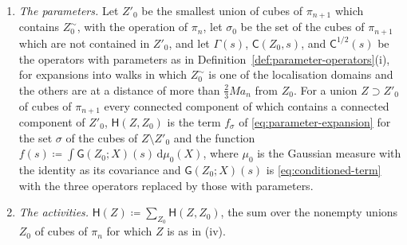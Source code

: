 \documentclass[11pt]{preprint}
\newcommand{\dd}{\mathrm{d}}
\numberwithin{equation}{section}
\begin{document}
\begin{definition}
\begin{enumerate}[label=(\roman*)]
\item \emph{The parameters.} Let $Z'_0$ be the smallest union of cubes of $\pi_{n+1}$ which contains $Z_0^\sim$, with the operation of $\pi_n$, let $\sigma_0$ be the set of the cubes of $\pi_{n+1}$ which are not contained in $Z'_0$, and let $\Gamma(s)$, $\mathsf C(Z_0, s)$, and $\mathsf C^{1/2}(s)$ be the operators with parameters as in Definition~\ref{def:parameter-operators}(i), for expansions into walks in which $Z_0^\sim$ is one of the localisation domains and the others are at a distance of more than $\frac{2}{3}Ma_n$ from $Z_0$. For a union $Z \supset Z'_0$ of cubes of $\pi_{n+1}$ every connected component of which contains a connected component of $Z'_0$, $\mathsf H(Z, Z_0)$ is the term $f_\sigma$ of \eqref{eq:parameter-expansion} for the set $\sigma$ of the cubes of $Z \setminus Z'_0$ and the function $f(s) \coloneqq \int\mathsf G(Z_0; X)(s)\,\dd\mu_0(X)$, where $\mu_0$ is the Gaussian measure with the identity as its covariance and $\mathsf G(Z_0; X)(s)$ is \eqref{eq:conditioned-term} with the three operators replaced by those with parameters.
\item \emph{The activities.} $\mathsf H(Z) \coloneqq \sum_{Z_0}\mathsf H(Z, Z_0)$, the sum over the nonempty unions $Z_0$ of cubes of $\pi_n$ for which $Z$ is as in (iv).
\end{enumerate}
\end{definition}
\end{document}
